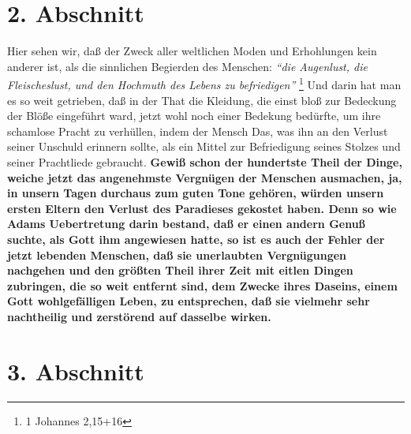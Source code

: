 \section{2. Abschnitt} \label{kap17_ab2}

Hier sehen wir, daß der Zweck aller weltlichen Moden und Erhohlungen kein
anderer ist, als die sinnlichen Begierden des Menschen:
\textit{"`die Augenlust, die
Fleischeslust, und den Hochmuth des Lebens zu befriedigen"'}
\footnote{1 Johannes 2,15+16}
Und darin hat man es so weit getrieben, daß in der That die Kleidung, die
einst bloß zur Bedeckung der Blöße eingeführt ward, jetzt wohl noch einer
Bedekung bedürfte, um ihre schamlose Pracht zu verhüllen, indem der Mensch Das,
was ihn an den Verlust seiner Unschuld erinnern sollte, als ein Mittel zur
Befriedigung seines Stolzes und seiner Prachtliede gebraucht. \textbf{Gewiß
schon der
hundertste Theil der Dinge, weiche jetzt das angenehmste Vergnügen der Menschen
ausmachen, ja, in unsern Tagen durchaus zum guten Tone gehören, würden unsern
ersten Eltern den Verlust des Paradieses gekostet haben. Denn so wie
Adams
Uebertretung darin bestand, daß er einen andern Genuß suchte, als Gott ihm
angewiesen hatte, so ist es auch der Fehler der jetzt lebenden Menschen, daß sie
unerlaubten Vergnügungen nachgehen und den größten Theil ihrer Zeit mit eitlen
Dingen zubringen, die so weit entfernt sind, dem Zwecke ihres Daseins, einem
Gott wohlgefälligen Leben, zu entsprechen, daß sie vielmehr sehr nachtheilig und
zerstörend auf dasselbe wirken.}

\section{3. Abschnitt} \label{kap17_ab3}

